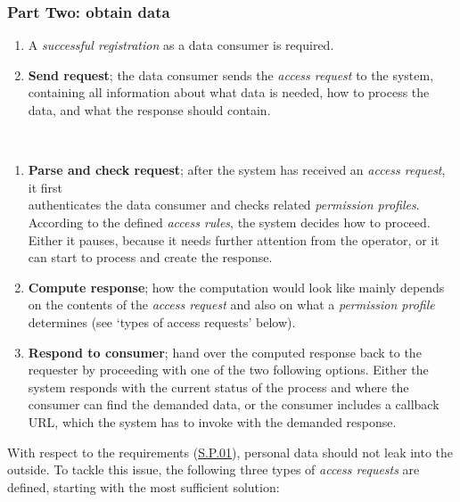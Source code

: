 \documentclass[12pt,english,a4paper,titlepage,cleardoublepage=empty,dottedtoc]{report}
\begin{document}
\subsubsection*{Part Two: obtain data}\label{part-two-obtain-data}

\begin{enumerate}
\def\labelenumi{\arabic{enumi})}
\setcounter{enumi}{-1}
\item
  A \emph{successful registration} as a data consumer is required.
\item
  \textbf{Send request}; the data consumer sends the \emph{access
  request} to the system, containing all information about what data is
  needed, how to process the data, and what the response should contain.
\end{enumerate}

~\\

\begin{enumerate}
\def\labelenumi{\arabic{enumi})}
\setcounter{enumi}{1}
\item
  \textbf{Parse and check request}; after the system has received an
  \emph{access request}, it first\\
  authenticates the data consumer and checks related \emph{permission
  profiles}. According to the defined \emph{access rules}, the system
  decides how to proceed. Either it pauses, because it needs further
  attention from the operator, or it can start to process and create the
  response.
\item
  \textbf{Compute response}; how the computation would look like mainly
  depends on the contents of the \emph{access request} and also on what
  a \emph{permission profile} determines (see `types of access requests'
  below).
\item
  \textbf{Respond to consumer}; hand over the computed response back to
  the requester by proceeding with one of the two following options.
  Either the system responds with the current status of the process and
  where the consumer can find the demanded data, or the consumer
  includes a callback URL, which the system has to invoke with the
  demanded response.
\end{enumerate}

With respect to the requirements (\protect\hyperlink{sp01}{S.P.01}),
personal data should not leak into the outside. To tackle this issue,
the following three types of \emph{access requests} are defined,
starting with the most sufficient solution:
\end{document}
